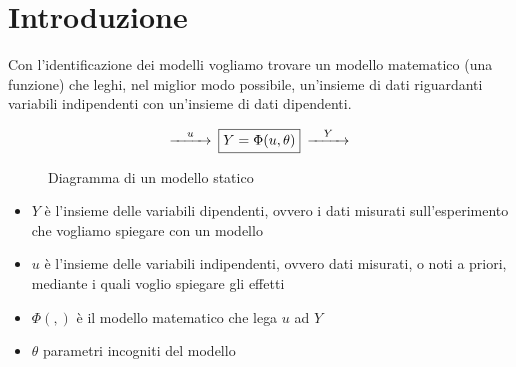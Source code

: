\section{Introduzione}
Con l'identificazione dei modelli vogliamo trovare un modello matematico (una funzione) che leghi, nel miglior modo possibile, un'insieme di dati riguardanti variabili indipendenti con un'insieme di dati dipendenti.

\begin{figure}[htbp]
  \centering
  \[
    \begin{CD}
       @>u>> \framebox{$Y=\Phi(u,\theta)$} @>Y>>
    \end{CD}
  \]
  \caption{Diagramma di un modello statico\label{fig:diagrammamodstat}}
\end{figure}

\begin{itemize}
    \item $Y$ è l'insieme delle variabili dipendenti, ovvero i dati misurati sull'esperimento che vogliamo spiegare con un modello
    \item $u$ è l'insieme delle variabili indipendenti, ovvero dati misurati, o noti a priori, mediante i quali voglio spiegare gli effetti
    \item $\Phi( , )$ è il modello matematico che lega $u$ ad $Y$
    \item $\theta$ parametri incogniti del modello
\end{itemize}


